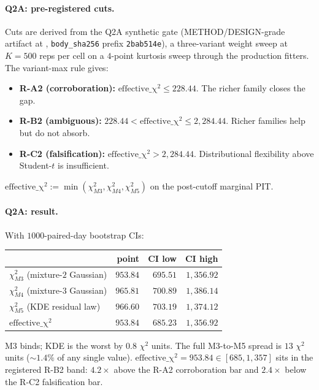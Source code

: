 \documentclass[11pt]{article}
\theoremstyle{definition}
\theoremstyle{plain}
\begin{document}
\paragraph{Q2A: pre-registered cuts.}
Cuts are derived from the Q2A synthetic gate (METHOD/DESIGN-grade
artifact at ,
\verb|body_sha256| prefix \verb|2bab514e|), a three-variant weight
sweep at $K = 500$ reps per cell on a $4$-point kurtosis sweep
through the production fitters. The variant-max rule gives:
\begin{itemize}[leftmargin=2em]
\item \textbf{R-A2 (corroboration):} $\mathrm{effective\_\chi^{2}}
\leq 228.44$. The richer family closes the gap.
\item \textbf{R-B2 (ambiguous):} $228.44 < \mathrm{effective\_\chi^{2}}
\leq 2{,}284.44$. Richer families help but do not absorb.
\item \textbf{R-C2 (falsification):} $\mathrm{effective\_\chi^{2}}
> 2{,}284.44$. Distributional flexibility above Student-$t$ is
insufficient.
\end{itemize}
$\mathrm{effective\_\chi^{2}} := \min(\chi^{2}_{M3}, \chi^{2}_{M4},
\chi^{2}_{M5})$ on the post-cutoff marginal PIT.

\paragraph{Q2A: result.}
With $1000$-paired-day bootstrap CIs:

\begin{center}
\begin{tabular}{lrrr}
\toprule
& point & CI low & CI high \\
\midrule
$\chi^{2}_{M3}$ (mixture-$2$ Gaussian) & $953.84$  & $695.51$ & $1{,}356.92$ \\
$\chi^{2}_{M4}$ (mixture-$3$ Gaussian) & $965.81$  & $700.89$ & $1{,}386.14$ \\
$\chi^{2}_{M5}$ (KDE residual law)     & $966.60$  & $703.19$ & $1{,}374.12$ \\
$\mathrm{effective\_\chi^{2}}$         & $953.84$  & $685.23$ & $1{,}356.92$ \\
\bottomrule
\end{tabular}
\end{center}

M3 binds; KDE is the worst by $0.8$ $\chi^{2}$ units. The full
M3-to-M5 spread is $13$ $\chi^{2}$ units ($\sim 1.4\%$ of any
single value). $\mathrm{effective\_\chi^{2}} = 953.84
\in [685, 1{,}357]$ sits in the registered R-B2 band: $4.2\times$
above the R-A2 corroboration bar and $2.4\times$ below the R-C2
falsification bar.
\end{document}

